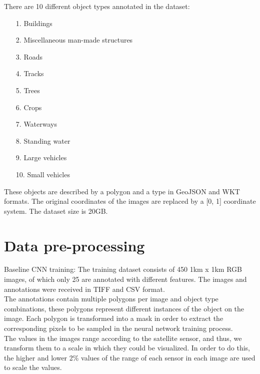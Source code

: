 \documentclass{article}
\begin{document}
There are 10 different object types annotated in the dataset:
\begin{itemize}
    \item[1.]{Buildings}
    \item[2.]{Miscellaneous man-made structures}
    \item[3.]{Roads}
    \item[4.]{Tracks}
    \item[5.]{Trees}
    \item[6.]{Crops}
    \item[7.]{Waterways}
    \item[8.]{Standing water}
    \item[9.]{Large vehicles}
    \item[10.]{Small vehicles}
\end{itemize}

These objects are described by a polygon and a type in GeoJSON and WKT formats. The original coordinates of the images are replaced by a [0, 1] coordinate system. The dataset size is 20GB.

\section{Data pre-processing}
Baseline CNN training: The training dataset consists of 450 1km x 1km RGB images, of which only 25 are annotated with different features. The images and annotations were received in TIFF and CSV format.\\

The annotations contain multiple polygons per image and object type combinations, these polygons represent different instances of the object on the image. Each polygon is transformed into a mask in order to extract the corresponding pixels to be sampled in the neural network training process.\\

The values in the images range according to the satellite sensor, and thus, we transform them to a scale in which they could be visualized. In order to do this, the higher and lower 2\% values  of the range of each sensor in each image are used to scale the values.\\
\end{document}
